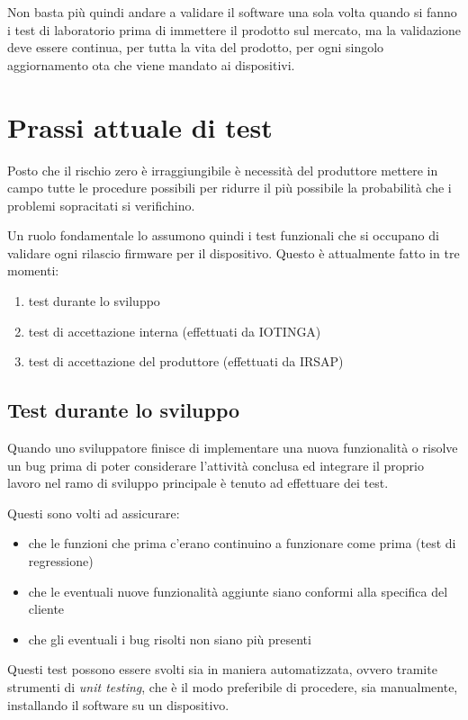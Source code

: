 \documentclass[12pt,a4paper,twoside,titlepage]{book}
\begin{document}
Non basta più quindi andare a validare il software una sola volta quando si fanno i test 
di laboratorio prima di immettere il prodotto sul mercato, ma la validazione deve essere continua, 
per tutta la vita del prodotto, per ogni singolo aggiornamento \acrfull{ota} che viene mandato 
ai dispositivi. 

\section{Prassi attuale di test}

Posto che il rischio zero è irraggiungibile è necessità del produttore mettere in campo 
tutte le procedure possibili per ridurre il più possibile la probabilità che i problemi 
sopracitati si verifichino.

Un ruolo fondamentale lo assumono quindi i test funzionali che si occupano di validare 
ogni rilascio firmware per il dispositivo. Questo è attualmente fatto in tre momenti:
\begin{enumerate}
    \item test durante lo sviluppo
    \item test di accettazione interna (effettuati da IOTINGA)
    \item test di accettazione del produttore (effettuati da IRSAP)
\end{enumerate}

\subsection{Test durante lo sviluppo}
\label{subsection:test_sviluppo}

Quando uno sviluppatore finisce di implementare una nuova funzionalità o risolve un
bug prima di poter considerare l'attività conclusa ed integrare il
proprio lavoro nel ramo di sviluppo principale è tenuto ad effettuare dei test.

Questi sono volti ad assicurare:
\begin{itemize}
    \item che le funzioni che prima c'erano continuino a funzionare come prima (test di regressione)
    \item che le eventuali nuove funzionalità aggiunte siano conformi alla specifica del cliente
    \item che gli eventuali i bug risolti non siano più presenti 
\end{itemize}

Questi test possono essere svolti sia in maniera automatizzata, ovvero tramite strumenti di 
\textit{unit testing}, che è il modo preferibile di procedere, sia manualmente, installando 
il software su un dispositivo. 
\end{document}

